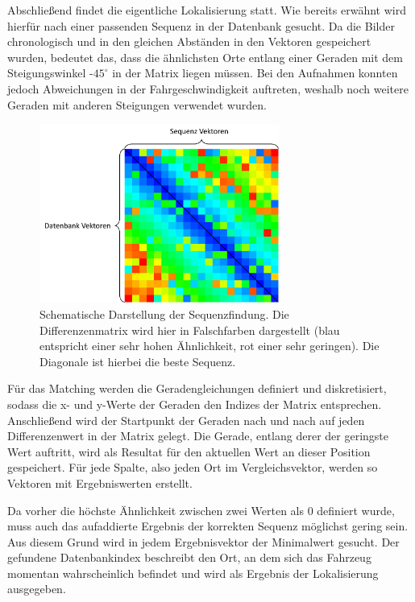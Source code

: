 \documentclass[12pt,a4paper,titlepage]{scrartcl}
\begin{document}
Abschließend findet die eigentliche Lokalisierung statt. Wie bereits erwähnt wird hierfür nach einer passenden Sequenz in der Datenbank gesucht. Da die Bilder chronologisch und in den gleichen Abständen in den Vektoren gespeichert wurden, bedeutet das, dass die ähnlichsten Orte entlang einer Geraden mit dem Steigungswinkel -$45^{\circ}$ in der Matrix liegen müssen. Bei den Aufnahmen konnten jedoch Abweichungen in der Fahrgeschwindigkeit auftreten, weshalb noch weitere Geraden mit anderen Steigungen verwendet wurden. 

\begin{figure}[h!]
	\centering
	\includegraphics[width=0.7\textwidth]{../Bilder/Differenzenmatrix_mit_Gerade.pdf}
	\caption[Schematische Darstellung der Sequenzfindung]{Schematische Darstellung der Sequenzfindung. Die Differenzenmatrix wird hier in Falschfarben dargestellt (blau entspricht einer sehr hohen Ähnlichkeit, rot einer sehr geringen). Die Diagonale ist hierbei die beste Sequenz.}
	\label{img:Diff_Mat_Gerade}
\end{figure}

Für das Matching werden die Geradengleichungen definiert und diskretisiert, sodass die x- und y-Werte der Geraden den Indizes der Matrix entsprechen. Anschließend wird der Startpunkt der Geraden nach und nach auf jeden Differenzenwert in der Matrix gelegt. Die Gerade, entlang derer der geringste Wert auftritt, wird als Resultat für den aktuellen Wert an dieser Position gespeichert. Für jede Spalte, also jeden Ort im Vergleichsvektor, werden so Vektoren mit Ergebniswerten erstellt.

Da vorher die höchste Ähnlichkeit zwischen zwei Werten als $0$ definiert wurde, muss auch das aufaddierte Ergebnis der korrekten Sequenz möglichst gering sein. Aus diesem Grund wird in jedem Ergebnisvektor der Minimalwert gesucht. Der gefundene Datenbankindex beschreibt den Ort,  an dem sich das Fahrzeug momentan wahrscheinlich befindet und wird als Ergebnis der Lokalisierung ausgegeben.
\end{document}

